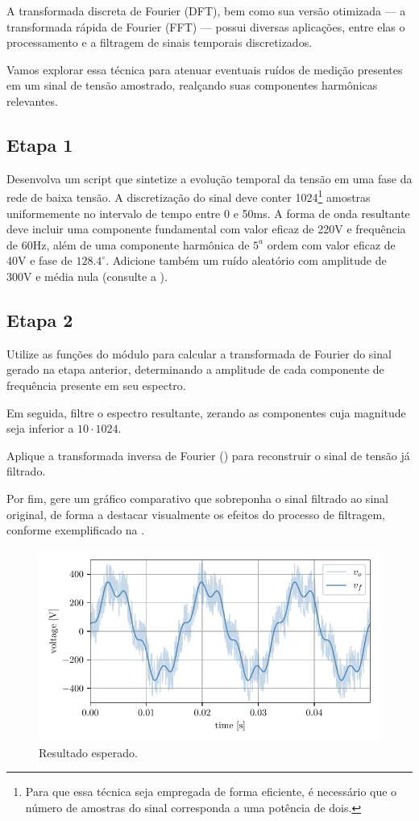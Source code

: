 A transformada discreta de Fourier (DFT), bem como sua versão otimizada --- a transformada rápida de Fourier
(FFT) --- possui diversas aplicações, entre elas o processamento e a filtragem de sinais temporais discretizados.

Vamos explorar essa técnica para atenuar eventuais ruídos de medição presentes em um sinal de tensão amostrado,
realçando suas componentes harmônicas relevantes.

\subsection*{Etapa 1}
Desenvolva um script que sintetize a evolução temporal da tensão em uma fase da rede de baixa tensão.
A discretização do sinal deve conter 1024\footnote{Para que essa técnica seja empregada de forma eficiente,
    é necessário que o número de amostras do sinal corresponda a uma potência de dois.} amostras uniformemente no
intervalo de tempo entre 0 e 50ms.
A forma de onda resultante deve incluir uma componente fundamental com valor eficaz de 220V e frequência de 60Hz,
além de uma componente harmônica de $5^a$ ordem com valor eficaz de 40V e fase de $128.4^\circ$.
Adicione também um ruído aleatório com amplitude de 300V e média nula (consulte a ).



\subsection*{Etapa 2}
Utilize as funções do módulo 
para calcular a transformada de Fourier do sinal gerado na etapa anterior, determinando a amplitude de cada componente
de frequência presente em seu espectro.

Em seguida, filtre o espectro resultante, zerando as componentes cuja magnitude seja inferior a $10 \cdot 1024$.

Aplique a transformada inversa de Fourier () para reconstruir o sinal de tensão já filtrado.

Por fim, gere um gráfico comparativo  que sobreponha o sinal filtrado ao sinal original, de forma a destacar
visualmente os efeitos do processo de filtragem, conforme exemplificado na .
\begin{figure}[htbp]
    \centering
    \includegraphics[scale=1.0]{figs/fft}
    \caption{Resultado esperado.}
    \label{fig:fft}
\end{figure}
